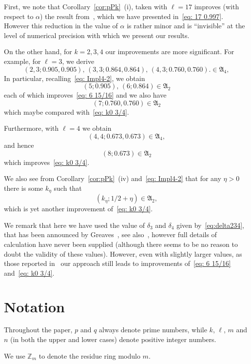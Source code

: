 \documentclass[12pt]{amsart}
\begin{document}
First, we note that Corollary~\ref{cor:pPk}~(i), taken with $\ell=17$
improves (with respect to $\alpha$) the result from~\cite[Section~4]{Shp}, which we have presented 
in~\eqref{eq: 17 0.997}. However this  reduction  in the value of $\alpha$ is rather minor 
and is ``invisible'' at the level of numerical precision with which we present our results.  

On the other hand, for $k=2,3,4$ our improvements are more significant. 
For example, for $\ell=3$, we derive 
$$(2, 3; 0.905,  0.905), \, (3, 3; 0.864,  0.864),  \, (4, 3; 0.760,  0.760).
  \in {{\mathfrak A}}_4,$$
 In particular, recalling~\eqref{eq: Impl4-2}, we obtain
 $$
 (5; 0.905),\,  (6; 0.864)  \in {{\mathfrak A}}_2$$
each of which  improves~\eqref{eq: 6 15/16} and 
we also have 
 $$
(7; 0.760,  0.760) \in {{\mathfrak A}}_2
$$
which maybe compared with~\eqref{eq: k0 3/4}.

Furthermore, with $\ell = 4$ we obtain  
$$
(4, 4; 0.673,  0.673) \in {{\mathfrak A}}_4,
$$
and hence
$$
(8; 0.673) \in {{\mathfrak A}}_2
$$
which  improves~\eqref{eq: k0 3/4}.

We also see from Corollary~\ref{cor:pPk}~(iv) and~\eqref{eq: Impl4-2} that for any $\eta> 0$ 
there is some $k_\eta$ such that 
\begin{equation}
\label{eq: k0 1/2}
(k_\eta; 1/2 + \eta) \in {{\mathfrak A}}_2, 
\end{equation}
which is yet another improvement of~\eqref{eq: k0 3/4}.

We remark that here we have used the value of $\delta_3$ and  $\delta_4$ 
given by~\eqref{eq:delta234}, that
has been announced by Greaves~\cite[Equation~(1.4)]{Gre1}, 
see also~\cite[pp.~174--175]{Gre2}, however full details  of calculation have 
never been supplied (although there seems to be no reason to doubt the validity 
of these values).  However, even with slightly larger values, as those reported 
in~\cite{Gre0} our approach still leads to improvements of~\eqref{eq: 6 15/16} and~\eqref{eq: k0 3/4}.
  
\section{Notation}

Throughout the paper,  $p$ and $q$ always denote  prime 
numbers, while  $k$, $\ell$, $m$ and $n$ (in both the upper and
lower cases) denote positive integer 
numbers. 

We use ${{\mathbb Z}}_m$ to denote the residue ring modulo $m$. 
\end{document}
